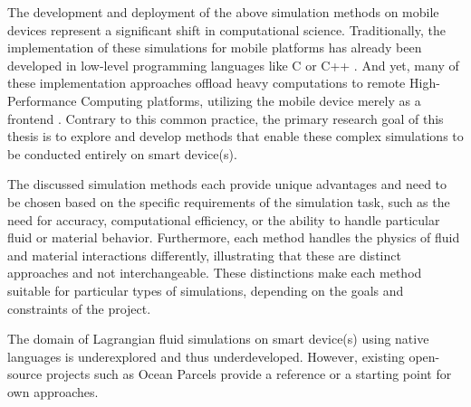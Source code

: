 The development and deployment of the above simulation methods on mobile devices represent a significant shift in computational science. Traditionally, the implementation of these simulations for mobile platforms has already been developed in low-level programming languages like C or C++ \cite{prototypeMobileImplementations}. And yet, many of these implementation approaches offload heavy computations to remote High-Performance Computing platforms, utilizing the mobile device merely as a frontend \cite{onlyFrontend}. 
Contrary to this common practice, the primary research goal of this thesis is to explore and develop methods that enable these complex simulations to be conducted entirely on \gls{smart device(s)}.
 \paraend


The discussed simulation methods each provide unique advantages and need to be chosen based on the specific requirements of the simulation task, such as the need for accuracy, computational efficiency, or the ability to handle particular fluid or material behavior. Furthermore, each method handles the physics of fluid and material interactions differently, illustrating that these are distinct approaches and not interchangeable. These distinctions make each method suitable for particular types of simulations, depending on the goals and constraints of the project. \paraend

The domain of Lagrangian fluid simulations on \gls{smart device(s)} using native languages is underexplored and thus underdeveloped. However, existing open-source projects such as Ocean Parcels \cite{parcels} provide a reference or a starting point for own approaches. \paraend